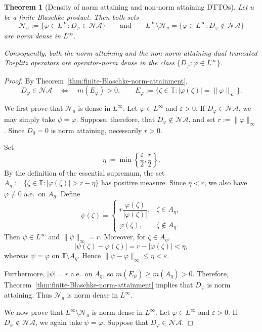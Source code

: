 \documentclass[10pt,a4paper]{amsart}
\newtheorem{theorem}{Theorem}
\def \T{\mathbb{T}}
\newcommand{\vp}{\varphi}
\begin{document}
\begin{theorem}[Density of norm attaining and non-norm attaining DTTOs]\label{thm:NA-density-finite-Blaschke}
Let $u$ be a finite Blaschke product. Then both sets
\[
\mathcal{N}_u:=\{\vp\in L^\infty:D_\vp\in\mathcal{NA}\}
\qquad\text{and}\qquad L^\infty\setminus\mathcal{N}_u
=\{\vp\in L^\infty:D_\vp\notin\mathcal{NA}\}
\]
are norm dense in $L^\infty$.
	
Consequently, both the norm attaining and the non-norm attaining
dual truncated Toeplitz operators are operator-norm dense in the class $\{D_\vp:\vp\in L^\infty\}$.
\end{theorem}

\begin{proof}
By Theorem~\ref{thm:finite-Blaschke-norm-attainment},
\[
D_\vp\in\mathcal{NA}\quad\Longleftrightarrow\quad m(E_\vp)>0,
\qquad E_\vp:=\{\zeta\in\T:|\vp(\zeta)|=\|\vp\|_\infty\}.
\]
	
We first prove that $\mathcal{N}_u$ is dense in $L^\infty$. Let $\vp\in L^\infty$ and $\varepsilon>0$. If $D_\vp\in\mathcal{NA}$, we may simply take $\psi=\vp$. Suppose, therefore, that $D_\vp\notin\mathcal{NA}$, and set $r:=\|\vp\|_\infty$. Since $D_0=0$ is norm attaining, necessarily $r>0$.
	
Set
\[
\eta:=\min\left\{\frac{\varepsilon}{2},\frac{r}{2}\right\}.
\]
By the definition of the essential supremum, the set $A_\eta:=\{\zeta\in\T:|\vp(\zeta)|>r-\eta\}$ has positive measure.
Since $\eta<r$, we also have $\vp\neq0$ a.e.\ on $A_\eta$. Define
\[
\psi(\zeta)
=\begin{cases}
		r\dfrac{\vp(\zeta)}{|\vp(\zeta)|},
		& \zeta\in A_\eta,\\[3mm]
		\vp(\zeta),
		& \zeta\notin A_\eta.
\end{cases}
\]
Then $\psi\in L^\infty$ and $\|\psi\|_\infty=r$. Moreover, for $\zeta\in A_\eta$,
\[
|\psi(\zeta)-\vp(\zeta)|=r-|\vp(\zeta)|<\eta,
\]
whereas $\psi=\vp$ on $\T\setminus A_\eta$. Hence $\|\psi-\vp\|_\infty\leq\eta<\varepsilon$.
	
Furthermore, $|\psi|=r$ a.e.\ on $A_\eta$, so $m(E_\psi)\geq m(A_\eta)>0$. Therefore, Theorem~\ref{thm:finite-Blaschke-norm-attainment} implies that
$D_\psi$ is norm attaining. Thus $\mathcal{N}_u$ is norm dense in
$L^\infty$.
	
We now prove that $L^\infty\setminus\mathcal{N}_u$ is norm dense in
$L^\infty$. Let $\vp\in L^\infty$ and $\varepsilon>0$. If $D_\vp\notin\mathcal{NA}$, we again take $\psi=\vp$. Suppose that
$D_\vp\in\mathcal{NA}$.
	

\end{proof}
\end{document}
